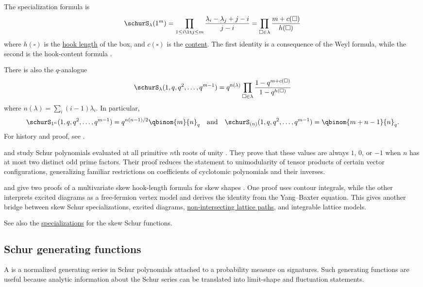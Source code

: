 The specialization formula is
\[
\schurS_{\lambda}(1^m) = \prod_{1\leq i \lt j \leq m} \frac{\lambda_i-\lambda_j + j-i}{j-i} =
\prod_{\square \in \lambda} \frac{m + c(\square)}{h(\square)}
\]
where $h(\square)$ is the \hyperref[partitionCores]{hook length} of the box,
and $c(\square)$ is the \hyperref[partitionCores]{content}.
The first identity is a consequence of the Weyl formula, while the second is
the hook-content formula \cite{Stanley1971}.

There is also the $q$-analogue
\[
\schurS_{\lambda}(1,q,q^2,\dotsc,q^{m-1}) =
q^{n(\lambda)}\prod_{\square \in \lambda} \frac{1-q^{m + c(\square)}}{1-q^{h(\square)}}
\]
where $n(\lambda) = \sum_{i}(i-1)\lambda_i$.
In particular,
\[
\schurS_{1^n}(1,q,q^2,\dotsc,q^{m-1}) = q^{n(n-1)/2}\qbinom{m}{n}_q
\quad \text{and} \quad
\schurS_{(n)}(1,q,q^2,\dotsc,q^{m-1}) = \qbinom{m+n-1}{n}_q.
\]
For history and proof, see \cite{Krattenthaler1999}.

 and  study Schur polynomials evaluated
at all primitive $n$th roots of unity \cite{HidakaItoh2024x}.  They prove that
these values are always $1$, $0$, or $-1$ when $n$ has at most two distinct odd
prime factors.  Their proof reduces the statement to unimodularity of tensor
products of certain vector configurations, generalizing familiar restrictions
on coefficients of cyclotomic polynomials and their inverses.

 and  give two proofs of a
multivariate skew hook-length formula for skew shapes \cite{PanovaPetrov2026}.
One proof uses contour integrals, while the other interprets excited diagrams
as a free-fermion vertex model and derives the identity from the
Yang--Baxter equation.  This gives another bridge between skew Schur
specializations, excited diagrams, \hyperref[lgvLemma]{non-intersecting lattice paths}, and
integrable lattice models.

See also the \hyperref[skewSchurSpecializations]{specializations} for the skew Schur functions.


\subsection[schurGeneratingFunctions]{Schur generating functions}

A \label{schurGeneratingFunction} is a
normalized generating series in
Schur polynomials attached to a probability measure on signatures.  Such
generating functions are useful because analytic information about the Schur
series can be translated into limit-shape and fluctuation statements.

